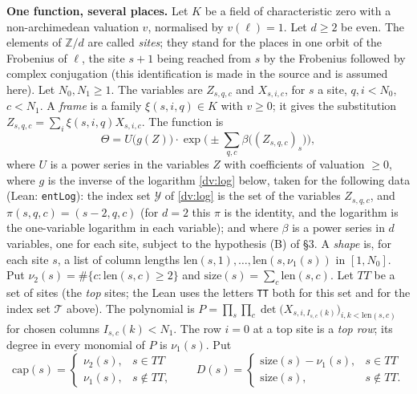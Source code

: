 \documentclass[11pt,letterpaper]{article}
\newcommand{\Z}{\mathbb Z}\newcommand{\Q}{\mathbb Q}\newcommand{\C}{\mathbb C}
\begin{document}
\textbf{One function, several places.} Let $K$ be a field of characteristic zero with a non-archimedean
valuation $v$, normalised by $v(\ell)=1$. Let $d\ge2$ be even. The elements of $\Z/d$ are called
\emph{sites}; they stand for the places in one orbit of the Frobenius of $\ell$, the site $s+1$ being
reached from $s$ by the Frobenius followed by complex conjugation (this identification is made in the
source and is assumed here). Let $N_0,N_1\ge1$. The variables are $Z_{s,q,c}$ and $X_{s,i,c}$, for $s$ a
site, $q,i<N_0$, $c<N_1$. A \emph{frame} is a family $\xi(s,i,q)\in K$ with $v\ge0$; it gives the substitution
$Z_{s,q,c}=\sum_i\xi(s,i,q)X_{s,i,c}$. The function is
\begin{equation}\label{dv:theta}
 \Theta=U\big(g(Z)\big)\cdot\exp\Big(\pm\sum_{q,c}\beta\big((Z_{s,q,c})_{s}\big)\Big),
\end{equation}
where $U$ is a power series in the variables $Z$ with coefficients of valuation $\ge0$, where $g$ is the
inverse of the logarithm \eqref{dv:log} below, taken for the following data (Lean: \texttt{entLog}): the
index set $\mathcal Y$ of \eqref{dv:log} is the set of the variables $Z_{s,q,c}$, and
$\pi(s,q,c)=(s-2,q,c)$ (for $d=2$ this $\pi$ is the identity, and the logarithm is the one-variable
logarithm in each variable); and where $\beta$ is a power series in $d$ variables, one for
each site, subject to the hypothesis (B) of \S3. A \emph{shape} is, for each site $s$, a list of column
lengths $\mathrm{len}(s,1),\ldots,\mathrm{len}(s,\nu_1(s))$ in $[1,N_0]$. Put $\nu_2(s)=\#\{c:\mathrm{len}(s,c)\ge2\}$ and
$\mathrm{size}(s)=\sum_c\mathrm{len}(s,c)$. Let $\mathit{TT}$ be a set of sites (the \emph{top} sites; the Lean
uses the letters \texttt{TT} both for this set and for the index set $\mathcal T$ above). The polynomial
is $P=\prod_s\prod_c\det\big(X_{s,i,I_{s,c}(k)}\big)_{i,k<\mathrm{len}(s,c)}$ for chosen columns $I_{s,c}(k)<N_1$.
The row $i=0$ at a top site is a \emph{top row}; its degree in every monomial of $P$ is $\nu_1(s)$. Put
\begin{equation}\label{dv:shape}
 \mathrm{cap}(s)=\begin{cases}\nu_2(s),&s\in\mathit{TT}\\ \nu_1(s),&s\notin\mathit{TT},\end{cases}\qquad
 D(s)=\begin{cases}\mathrm{size}(s)-\nu_1(s),&s\in\mathit{TT}\\ \mathrm{size}(s),&s\notin\mathit{TT}.\end{cases}
\end{equation}
\end{document}
